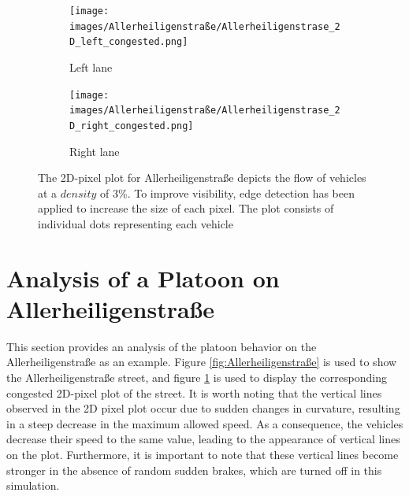 \begin{landscape}
  \begin{figure}
    \centering
    \begin{subfigure}[b]{1.0\linewidth}
      \centering
      \texttt{[image: images/Allerheiligenstraße/Allerheiligenstrase\_2D\_left\_congested.png]}
      \caption{Left lane}
    \end{subfigure}
    \hfill
    \begin{subfigure}[b]{1.0\linewidth}
      \centering
      \texttt{[image: images/Allerheiligenstraße/Allerheiligenstrase\_2D\_right\_congested.png]}
      \caption{Right lane}
    \end{subfigure}
    \caption{The 2D-pixel plot for Allerheiligenstraße depicts the flow of vehicles at a $density$ of 3\%. To improve visibility, edge detection has been applied to increase the size of each pixel. The plot consists of individual dots representing each vehicle}
    \label{fig:Allerheiligenstraße_2D}
  \end{figure}
\end{landscape}


\section{Analysis of a Platoon on Allerheiligenstraße}
\label{Analysis of a Platoon on Allerheiligenstraße}
This section provides an analysis of the platoon behavior on the Allerheiligenstraße as an example. Figure \ref{fig:Allerheiligenstraße} is used to show the Allerheiligenstraße street, and figure \ref{fig:Allerheiligenstraße_2D} is used to display the corresponding congested 2D-pixel plot of the street. It is worth noting that the vertical lines observed in the 2D pixel plot occur due to sudden changes in curvature, resulting in a steep decrease in the maximum allowed speed. As a consequence, the vehicles decrease their speed to the same value, leading to the appearance of vertical lines on the plot. Furthermore, it is important to note that these vertical lines become stronger in the absence of random sudden brakes, which are turned off in this simulation.\\

